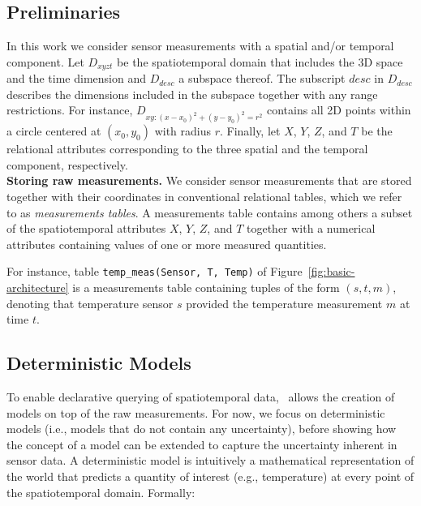 \subsection{Preliminaries}
\label{sec:prelims}

In this work we consider sensor measurements with a spatial and/or temporal component. Let  $D_{xyzt}$ be the spatiotemporal domain that includes the 3D space and the time dimension and $D_{desc}$ a subspace thereof. The subscript $desc$ in $D_{desc}$ describes the dimensions included in the subspace together with any range restrictions. For instance, $D_{xy: (x-x_0)^2+(y-y_0)^2 = r^2}$ contains all 2D points within a circle centered at $(x_0, y_0)$ with radius $r$. Finally, let $X$, $Y$, $Z$, and $T$ be the relational attributes corresponding to the three spatial and the temporal component, respectively.\\

{\bf Storing raw measurements.} We consider sensor measurements that are stored together with their coordinates in conventional relational tables, which we refer to as {\em measurements tables}. A measurements table contains among others a subset of the spatiotemporal attributes $X$, $Y$, $Z$, and $T$ together with a numerical attributes containing values of one or more measured quantities.

\begin{example}
For instance, table \texttt{temp\_meas(Sensor, T, Temp)} of Figure~\ref{fig:basic-architecture} is a measurements table containing tuples of the form $(s, t, m)$, denoting that temperature sensor $s$ provided the temperature measurement $m$ at time $t$.
\end{example}

\subsection{Deterministic Models}
\label{sec:deterministic-models}

To enable declarative querying of spatiotemporal data, \projName\ allows the creation of models on top of the raw measurements. For now, we focus on deterministic models (i.e., models that do not contain any uncertainty), before showing how the concept of a model can be extended to capture the uncertainty inherent in sensor data. A deterministic model is intuitively a mathematical representation of the world that predicts a quantity of interest (e.g., temperature) at every point of the spatiotemporal domain. Formally:

